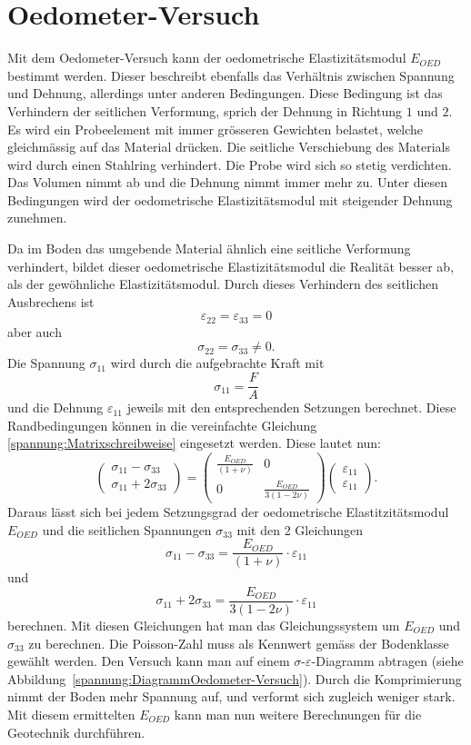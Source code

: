 \section{Oedometer-Versuch\label{spannung:section:Oedometer-Versuch}}
Mit dem Oedometer-Versuch kann der oedometrische Elastizitätsmodul $E_{OED}$ bestimmt werden.
Dieser beschreibt ebenfalls das Verhältnis zwischen Spannung und Dehnung, allerdings unter anderen Bedingungen.
Diese Bedingung ist das Verhindern der seitlichen Verformung, sprich der Dehnung in Richtung $1$ und $2$.
Es wird ein Probeelement mit immer grösseren Gewichten belastet, welche gleichmässig auf das Material drücken.
Die seitliche Verschiebung des Materials wird durch einen Stahlring verhindert.
Die Probe wird sich so stetig verdichten.
Das Volumen nimmt ab und die Dehnung nimmt immer mehr zu.
Unter diesen Bedingungen wird der oedometrische Elastizitätsmodul mit steigender Dehnung zunehmen.

Da im Boden das umgebende Material ähnlich eine seitliche Verformung verhindert,
bildet dieser oedometrische Elastizitätsmodul die Realität besser ab, als der gewöhnliche Elastizitätsmodul.
Durch dieses Verhindern des seitlichen Ausbrechens ist
\[
\varepsilon_{22}
=
\varepsilon_{33}
=
0
\]
aber auch
\[
\sigma_{22}
=
\sigma_{33}
\neq 0
.
\]
Die Spannung $\sigma_{11}$ wird durch die aufgebrachte Kraft mit
\[
\sigma_{11}
=
\frac{F}{A}
\]
und die Dehnung $\varepsilon_{11}$ jeweils mit den entsprechenden Setzungen berechnet.
Diese Randbedingungen können in die vereinfachte Gleichung \eqref{spannung:Matrixschreibweise} eingesetzt werden.
Diese lautet nun:
\[
\begin{pmatrix}
	\sigma_{11}-\sigma_{33} \\
	\sigma_{11}+2\sigma_{33}
\end{pmatrix}
=
\begin{pmatrix}
	\frac{E_{OED}}{(1+\nu)} &                             0 \\
                          0 & \frac{E_{OED}}{3(1-2\nu)}
\end{pmatrix}
\begin{pmatrix}
	\varepsilon_{11}\\
	\varepsilon_{11}
\end{pmatrix}
.
\]
Daraus lässt sich bei jedem Setzungsgrad der oedometrische Elastitzitätsmodul $E_{OED}$ und die seitlichen Spannungen $\sigma_{33}$ mit den 2 Gleichungen
\[
\sigma_{11}-\sigma_{33}
=
\frac{E_{OED}}{(1+\nu)}\cdot\varepsilon_{11}
\]
und
\[
\sigma_{11}+2\sigma_{33}
=
\frac{E_{OED}}{3(1-2\nu)}\cdot\varepsilon_{11}
\]
berechnen.
Mit diesen Gleichungen hat man das Gleichungssystem um $E_{OED}$ und $\sigma_{33}$ zu berechnen.
Die Poisson-Zahl muss als Kennwert gemäss der Bodenklasse gewählt werden.
Den Versuch kann man auf einem $\sigma$-$\varepsilon$-Diagramm abtragen (siehe Abbildung~\ref{spannung:DiagrammOedometer-Versuch}).
Durch die Komprimierung nimmt der Boden mehr Spannung auf, und verformt sich zugleich weniger stark.
Mit diesem ermittelten $E_{OED}$ kann man nun weitere Berechnungen für die Geotechnik durchführen.


